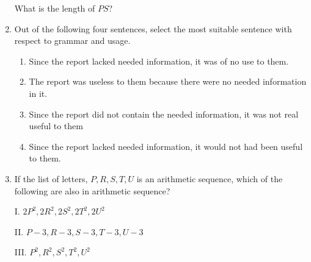 \documentclass[journal,12pt,onecolumn]{IEEEtran}
\theoremstyle{remark}
\begin{document}
\begin{enumerate}
		
		What is the length of $PS$?
		
		\hfill{}
		
		\begin{enumerate}
		\end{enumerate}
		
		\item Out of the following four sentences, select the most suitable sentence with respect to grammar and usage.
		
		\hfill{\brak{\text{GATE CS 2015}}}
		
		\begin{enumerate}
			\item Since the report lacked needed information, it was of no use to them.
			\item The report was useless to them because there were no needed information in it.
			\item Since the report did not contain the needed information, it was not real useful to them
			\item Since the report lacked needed information, it would not had been useful to them.
		\end{enumerate}
		
		\item If the list of letters, $P,R,S,T,U$ is an arithmetic sequence, which of the following are also in arithmetic sequence?
		
		I. $2P^2, 2R^2, 2S^2, 2T^2, 2U^2$
		
		II. $P-3,R-3,S-3,T-3, U-3$
		
		III. $P^2, R^2, S^2,T^2, U^2$
		
		\hfill{}
		
		\begin{enumerate}
		\end{enumerate}
		

\end{enumerate}
\end{document}

